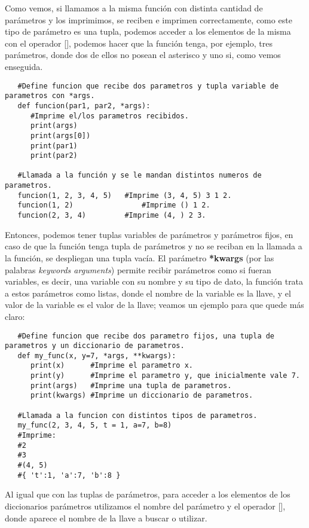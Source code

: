 Como vemos, si llamamos a la misma función con distinta cantidad de parámetros y los imprimimos, se reciben e imprimen correctamente, como este tipo de parámetro es una tupla, podemos acceder a los elementos de la misma con el operador [], podemos hacer que la función tenga, por ejemplo, tres parámetros, donde dos de ellos no posean el asterisco y uno si, como vemos enseguida.
\begin{lstlisting}
   #Define funcion que recibe dos parametros y tupla variable de parametros con *args.
   def funcion(par1, par2, *args):
      #Imprime el/los parametros recibidos.
      print(args)
      print(args[0])
      print(par1)
      print(par2)
   
   #Llamada a la función y se le mandan distintos numeros de parametros.   
   funcion(1, 2, 3, 4, 5)	#Imprime (3, 4, 5) 3 1 2.
   funcion(1, 2)				#Imprime () 1 2.
   funcion(2, 3, 4)			#Imprime (4, ) 2 3.
\end{lstlisting}

Entonces, podemos tener tuplas variables de parámetros y parámetros fijos, en caso de que la función tenga tupla de parámetros y no se reciban en la llamada a la función, se despliegan una tupla vacía. El parámetro \textbf{*kwargs} (por las palabras \textit{keywords arguments}) permite recibir parámetros como si fueran variables, es decir, una variable con su nombre y su tipo de dato, la función trata a estos parámetros como listas, donde el nombre de la variable es la llave, y el valor de la variable es el valor de la llave; veamos un ejemplo para que quede más claro:
\begin{lstlisting}
   #Define funcion que recibe dos parametro fijos, una tupla de parametros y un diccionario de parametros.
   def my_func(x, y=7, *args, **kwargs):
      print(x)		#Imprime el parametro x.
      print(y)		#Imprime el parametro y, que inicialmente vale 7.
      print(args)	#Imprime una tupla de parametros.
      print(kwargs)	#Imprime un diccionario de parametros.

   #Llamada a la funcion con distintos tipos de parametros.
   my_func(2, 3, 4, 5, t = 1, a=7, b=8)
   #Imprime:
   #2
   #3
   #(4, 5)
   #{ 't':1, 'a':7, 'b':8 }
\end{lstlisting}

Al igual que con las tuplas de parámetros, para acceder a los elementos de los diccionarios parámetros utilizamos el nombre del parámetro y el operador [], donde aparece el nombre de la llave a buscar o utilizar.


